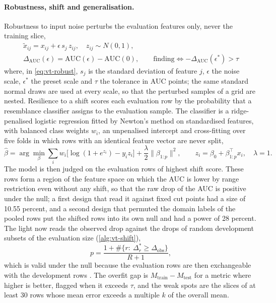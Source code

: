 

\paragraph{Robustness, shift and generalisation.} Robustness to input noise perturbs the evaluation features only, never the training slice,
\begin{equation}
  \begin{gathered}
  \tilde x_{ij}=x_{ij}+\epsilon\,s_j\,z_{ij},\quad z_{ij}\sim N(0,1),\\
  \Delta_{\mathrm{AUC}}(\epsilon)=\mathrm{AUC}(\epsilon)-\mathrm{AUC}(0),\qquad\text{finding}\iff-\Delta_{\mathrm{AUC}}(\epsilon^{*})>\tau\end{gathered}
  \label{eq:vt-robust}
\end{equation}
where, in \cref{eq:vt-robust}, $s_j$ is the standard deviation of feature $j$, $\epsilon$ the noise scale, $\epsilon^{*}$ the preset scale and $\tau$ the tolerance in AUC points; the same standard normal draws are used at every scale, so that the
perturbed samples of a grid are nested. Resilience to a shift scores each evaluation row by the probability that a resemblance classifier assigns to the evaluation sample. The classifier is a ridge-penalised logistic
regression fitted by Newton's method on standardised features, with balanced class weights $w_i$, an unpenalised intercept and cross-fitting over five folds in which rows with an identical feature vector are never split,
\begin{equation}
  \hat\beta=\arg\min_\beta\sum_i w_i\bigl[\log(1+e^{z_i})-y_iz_i\bigr]+\frac{\lambda}{2}\lVert\beta_{1:p}\rVert^2,\qquad z_i=\beta_0+\beta_{1:p}^{\top}x_i,\quad\lambda=1.
  \label{eq:vt-shift-score}
\end{equation}
The model is then judged on the evaluation rows of highest shift score. These rows form a region of the feature space on which the AUC is lower by range restriction even without any shift, so that the raw drop of the AUC
is positive under the null; a first design that read it against fixed cut points had a size of 10.55 percent, and a second design that permuted the domain labels of the pooled rows put the shifted rows into its own null
and had a power of 28 percent. The light now reads the observed drop against the drops of random development subsets of the evaluation size (\cref{alg:vt-shift}),
\begin{equation}
  p=\frac{1+\#\{r:\ \Delta^{*}_r\ge\Delta_{\mathrm{obs}}\}}{R+1},
  \label{eq:vt-shift-p}
\end{equation}
which is valid under the null because the evaluation rows are then exchangeable with the development rows \citep{validation-tests:phipson2010}. The overfit gap is $M_{\mathrm{train}}-M_{\mathrm{test}}$ for a metric where higher is
better, flagged when it exceeds $\tau$, and the weak spots are the slices of at least 30 rows whose mean error exceeds a multiple $k$ of the overall mean.

